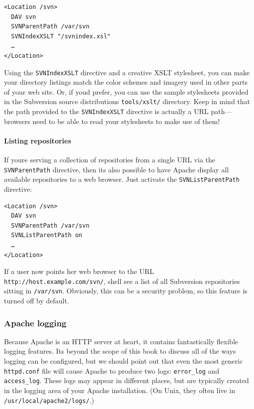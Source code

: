 \begin{verbatim}
<Location /svn>
  DAV svn
  SVNParentPath /var/svn
  SVNIndexXSLT "/svnindex.xsl"
  …
</Location>
\end{verbatim}

Using the \texttt{SVNIndexXSLT} directive and a creative XSLT
stylesheet, you can make your directory listings match the color schemes
and imagery used in other parts of your web site. Or, if
you\textquotesingle d prefer, you can use the sample stylesheets
provided in the Subversion source distribution\textquotesingle s
\texttt{tools/xslt/} directory. Keep in mind that the path provided to
the \texttt{SVNIndexXSLT} directive is actually a URL path---browsers
need to be able to read your stylesheets to make use of them!

\paragraph{Listing
repositories}\label{svn.serverconfig.httpd.extra.browsing.reposlisting}

If you\textquotesingle re serving a collection of repositories from a
single URL via the \texttt{SVNParentPath} directive, then
it\textquotesingle s also possible to have Apache display all available
repositories to a web browser. Just activate the
\texttt{SVNListParentPath} directive:

\begin{verbatim}
<Location /svn>
  DAV svn
  SVNParentPath /var/svn
  SVNListParentPath on
  …
</Location>
\end{verbatim}

If a user now points her web browser to the URL
\texttt{http://host.example.com/svn/}, she\textquotesingle ll see a list
of all Subversion repositories sitting in \texttt{/var/svn}. Obviously,
this can be a security problem, so this feature is turned off by
default.

\subsubsection{Apache
logging}\label{svn.serverconfig.httpd.extra.logging}

Because Apache is an HTTP server at heart, it contains fantastically
flexible logging features. It\textquotesingle s beyond the scope of this
book to discuss all of the ways logging can be configured, but we should
point out that even the most generic \texttt{httpd.conf} file will cause
Apache to produce two logs: \texttt{error\_log} and
\texttt{access\_log}. These logs may appear in different places, but are
typically created in the logging area of your Apache installation. (On
Unix, they often live in \texttt{/usr/local/apache2/logs/}.)

